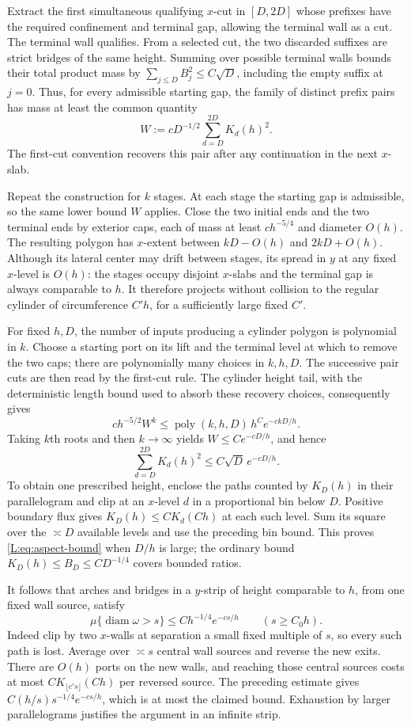 \documentclass[11pt]{article}
\numberwithin{equation}{section}
\theoremstyle{definition}\newtheorem{definition}[theorem]{Definition}
\theoremstyle{remark}\newtheorem{remark}[theorem]{Remark}
\begin{document}
Extract the first simultaneous qualifying $x$-cut in $[D,2D]$
whose prefixes have the required confinement and terminal gap, allowing
the terminal wall as a cut.  The terminal wall qualifies.  From a selected cut, the two discarded
suffixes are strict bridges of the same height.  Summing over possible
terminal walls bounds their total product mass by
$\sum_{j\le D}B_j^2\le C\sqrt D$, including the empty suffix at $j=0$.
Thus, for every admissible starting gap, the family of distinct
prefix pairs has mass at least the common quantity
\[
 W:=cD^{-1/2}\sum_{d=D}^{2D}K_d(h)^2.
\]
The first-cut convention recovers this pair after any continuation in
the next $x$-slab.

Repeat the construction for $k$ stages.  At each stage the starting
gap is admissible, so the same lower bound $W$ applies.  Close the two
initial ends and the two terminal ends by exterior caps, each of
mass at least $ch^{-5/4}$ and diameter $O(h)$.  The resulting polygon
has $x$-extent between $kD-O(h)$ and $2kD+O(h)$.  Although its lateral
center may drift between stages, its spread in $y$ at any fixed
$x$-level is $O(h)$: the stages occupy disjoint $x$-slabs and the
terminal gap is always comparable to $h$.  It therefore projects
without collision to the regular cylinder of circumference $C'h$,
for a sufficiently large fixed $C'$.

For fixed $h,D$, the number of inputs producing a cylinder polygon is
polynomial in $k$.  Choose a starting port on its lift and the terminal
level at which to remove the two caps; there are polynomially many
choices in $k,h,D$.  The successive pair cuts are then read by the
first-cut rule.  The cylinder height tail, with the deterministic
length bound used to absorb these recovery choices, consequently gives
\[
 c h^{-5/2}W^k
 \le \operatorname{poly}(k,h,D)\,h^C e^{-ckD/h}.
\]
Taking $k$th roots and then $k\to\infty$ yields $W\le C e^{-cD/h}$,
and hence
\[
 \sum_{d=D}^{2D}K_d(h)^2\le C\sqrt D\,e^{-cD/h}.
\]
To obtain one prescribed height, enclose the paths counted by $K_D(h)$
in their parallelogram and clip at an $x$-level $d$ in a proportional
bin below $D$.  Positive boundary flux gives
$K_D(h)\le C K_d(Ch)$ at each such level.  Sum its square over the
$\asymp D$ available levels and use the preceding bin bound.  This
proves \eqref{L:eq:aspect-bound} when $D/h$ is large; the ordinary
bound $K_D(h)\le B_D\le CD^{-1/4}$ covers bounded ratios.

It follows that arches and bridges in a $y$-strip of height comparable
to $h$, from one fixed wall source, satisfy
\[
 \mu\{\operatorname{diam}\omega>s\}
 \le C h^{-1/4}e^{-cs/h}\qquad(s\ge C_0h).
\]
Indeed clip by two $x$-walls at separation a small fixed multiple of
$s$, so every such path is lost.  Average over $\asymp s$ central
wall sources and reverse the new exits.  There are $O(h)$ ports on
the new walls, and reaching those central sources costs at most
$C K_{\lfloor c's\rfloor}(Ch)$ per reversed source.  The preceding
estimate gives $C(h/s)s^{-1/4}e^{-cs/h}$, which is at most the claimed
bound.  Exhaustion by larger parallelograms justifies the argument in
an infinite strip.
\end{document}
